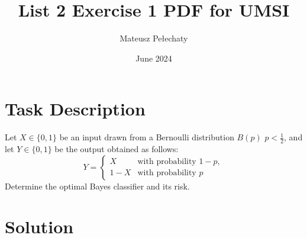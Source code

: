 \documentclass[11pt]{article}
\title{List 2 Exercise 1 PDF for UMSI}
\author{Mateusz Pełechaty}
\date{June 2024}
\begin{document}
\maketitle 

\section{Task Description}
Let $X \in \{0, 1\}$ 
be an input drawn from a Bernoulli distribution $B(p)$ $p < \frac{1}{2}$, 
and let $Y \in \{0, 1\}$ be the output obtained as follows:
$$
Y =
\begin{cases} 
X & \textrm{with probability } 1 - p, \\ 
1 - X & \textrm{with probability } p 
\end{cases}
$$
Determine the optimal Bayes classifier and its risk.

\section{Solution}
\end{document}
